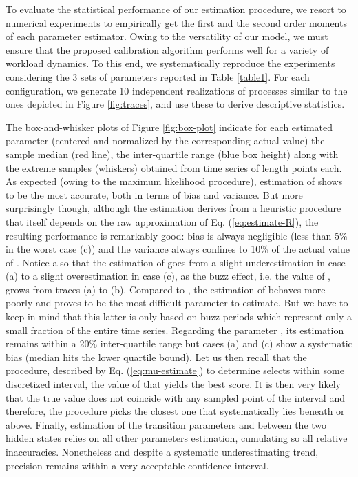 \documentclass[twoside]{article}
\newcommand{\roy}[2]{#2}
\begin{document}
{
To evaluate the statistical performance of our estimation procedure, we resort to numerical experiments to empirically get the first and the second order moments of each parameter estimator. Owing to  the versatility of our model, we must ensure that the proposed calibration algorithm performs well for a variety of workload dynamics. To this end, we systematically reproduce the experiments considering the 3 sets of parameters reported in Table \ref{table1}. For each configuration, we generate 10 independent  realizations of processes similar to the ones depicted in Figure \ref{fig:traces}, and use these to derive  descriptive statistics. 

The box-and-whisker plots of Figure \ref{fig:box-plot} indicate for each estimated parameter (centered and normalized by the corresponding actual value) the sample median (red line), the inter-quartile range (blue box height) along with  the extreme samples (whiskers) obtained from time series of length  points each. As expected (owing to the maximum likelihood procedure), estimation of  shows to be the most accurate, both in terms of bias and variance. But more surprisingly though, although the estimation  derives from a heuristic procedure that  itself depends on the raw approximation  of Eq. (\ref{eq:estimate-R}), the resulting performance is remarkably good: bias is always negligible (less than 5\% in the worst case (c))  and the variance always confines to 10\% of the actual value of . Notice also that the estimation of  goes from a slight underestimation in case (a) to a slight overestimation in case (c), as the buzz effect,  i.e. the value of , grows from traces (a) to (b). Compared to , the estimation of  behaves more poorly and proves to be the most difficult parameter to estimate. But we have to keep in mind that this latter is only based on buzz periods which represent only a small fraction of the entire time series. Regarding the parameter , its estimation remains within a 20\% inter-quartile range but cases (a) and (c) show a systematic bias (median hits the lower quartile bound). Let us then recall that the procedure\roy{}{, described by Eq.} (\ref{eq:mu-estimate}) to determine  selects within some discretized interval, the value of  that yields the best  score. It is then very likely that the true value does not coincide with any sampled point of the interval and therefore, the procedure picks the closest one that systematically lies beneath or above. Finally,  estimation of the transition parameters  and  between the two hidden states relies on all other parameters estimation, cumulating so all relative inaccuracies. Nonetheless and despite a systematic underestimating trend, precision remains within a very acceptable confidence interval. 
}
\end{document}
